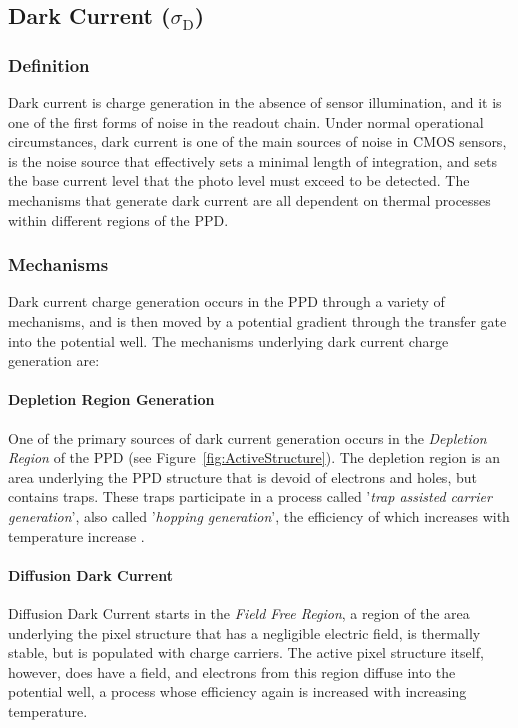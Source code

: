 \documentclass[10pt]{article}
\begin{document}
\subsection{Dark Current (\boldmath $\sigma_{\text{D}}$)}

\subsubsection{Definition}

Dark current is charge generation in the absence of sensor illumination, and it is one of the first forms of noise in the readout chain. Under normal operational circumstances, dark current is one of the main sources of noise in CMOS sensors, is the noise source that effectively sets a minimal length of integration, and sets the base current level that the photo level must exceed to be detected. The mechanisms that generate dark current are all dependent on thermal processes within different regions of the PPD. 

\subsubsection{Mechanisms}

Dark current charge generation occurs in the PPD through a variety of mechanisms, and is then moved by a potential gradient through the transfer gate into the potential well. The mechanisms underlying dark current charge generation are:

\paragraph{Depletion Region Generation}
One of the primary sources of dark current generation occurs in the \emph{Depletion Region} of the PPD (see Figure~\ref{fig:ActiveStructure}). The depletion region is an area underlying the PPD structure that is devoid of electrons and holes, but contains traps. These traps participate in a process called '\emph{trap assisted carrier generation}', also called '\emph{hopping generation}', the efficiency of which increases with temperature increase \cite{janesick}.

\paragraph{Diffusion Dark Current}
Diffusion Dark Current starts in the \emph{Field Free Region}, a region of the area underlying the pixel structure that has a negligible electric field, is thermally stable, but is populated with charge carriers. The active pixel structure itself, however, does have a field, and electrons from this region diffuse into the potential well, a process whose efficiency again is increased with increasing temperature.
\end{document}
